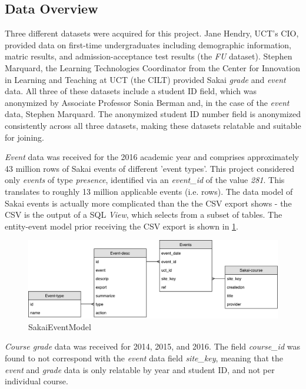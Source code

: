 \subsection{Data Overview}
Three different datasets were acquired for this project. Jane Hendry, UCT's CIO, provided data on first-time undergraduates including demographic information, matric results, and admission-acceptance test results (the \textit{FU} dataset). Stephen Marquard, the Learning Technologies Coordinator from the Center for Innovation in Learning and Teaching at UCT (the CILT) provided Sakai \textit{grade} and \textit{event} data. All three of these datasets include a student ID field, which was anonymized by Associate Professor Sonia Berman and, in the case of the \textit{event} data, Stephen Marquard. The anonymized student ID number field is anonymized consistently across all three datasets, making these datasets relatable and suitable for joining.

\textit{Event} data was received for the 2016 academic year and comprises approximately 43 million rows of Sakai events of different 'event types'. This project considered only \textit{events} of type \textit{presence}, identified via an \textit{event\_id} of the value \textit{281}. This translates to roughly 13 million applicable events (i.e. rows). The data model of Sakai events is actually more complicated than the the CSV export shows - the CSV is the output of a SQL \textit{View}, which selects from a subset of tables. The entity-event model prior receiving the CSV export is shown in \ref{SakaiEventModel}.

\begin{figure}[h]
    \centering
    \includegraphics[scale=0.4]{./resources/figures/SakaiEvents}
    \caption[SakaiEventModel]{SakaiEventModel}
    \label{SakaiEventModel}
\end{figure}

\textit{Course grade} data was received for 2014, 2015, and 2016. The field \textit{course\_id} was found to not correspond with the \textit{event} data field \textit{site\_key}, meaning that the \textit{event} and \textit{grade} data is only relatable by year and student ID, and not per individual course.

